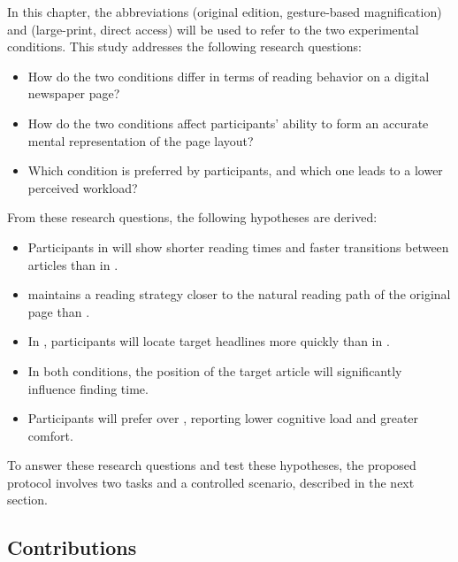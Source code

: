In this chapter, the abbreviations \condonenot (original edition, gesture-based magnification) and \condtwonot (large-print, direct access) will be used to refer to the two experimental conditions.
This study addresses the following research questions:

\begin{itemize}
    \item[RQ1] How do the two conditions differ in terms of reading behavior on a digital newspaper page?
    \item[RQ2] How do the two conditions affect participants' ability to form an accurate mental representation of the page layout?
    \item[RQ3] Which condition is preferred by participants, and which one leads to a lower perceived workload?
\end{itemize}

From these research questions, the following hypotheses are derived:

\begin{itemize}
    \item[\hypperformance] Participants in \condtwonot will show shorter reading times and faster transitions between articles than in \condonenot.
    \item[\hyppath] \condtwonot maintains a reading strategy closer to the natural reading path of the original page than \condonenot.
    \item[\hypfindingperformance] In \condtwonot, participants will locate target headlines more quickly than in \condonenot.
    \item[\hypfindingpositions] In both conditions, the position of the target article will significantly influence finding time.
    \item[\hyppreference] Participants will prefer \condtwonot over \condonenot, reporting lower cognitive load and greater comfort.
\end{itemize}

To answer these research questions and test these hypotheses, the proposed protocol involves two tasks and a controlled scenario, described in the next section.

\subsection{Contributions}

